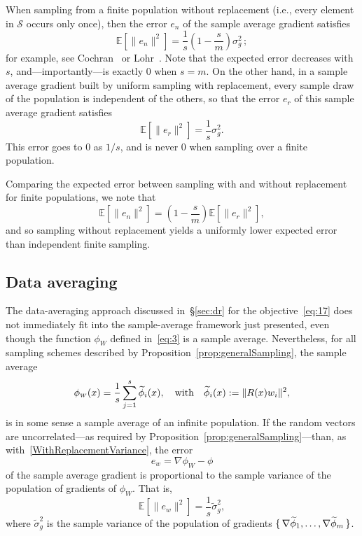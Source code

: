 \documentclass[nospthms]{svjour3}
\numberwithin{equation}{section}
\def\norm#1{\|#1\|}
\def\text #1{\hbox{\quad#1\quad}}
\def\W{_{\scriptscriptstyle W}}
\def\phitilde{\skew3\widetilde\phi}
\def\sigmatilde{\widetilde\sigma}
\def\Sscr{\mathcal{S}}
\def\expval{\mathbb{E}}
\def\sample{\Sscr}
\begin{document}
When sampling from a finite population without replacement (i.e.,
every element in $\sample$ occurs only once), then the error $e_n$ of
the sample average gradient satisfies
\begin{equation} \label{WithoutReplacementVariance}
  \expval[\norm{e_n}^2] = \frac1s\left(1 - \frac{s}{m}\right) \sigma^2_g\,;
\end{equation}
for example, see Cochran~\cite{Cochran1977} or
Lohr~\cite[\S2.7]{lohr1999sampling}.  Note that the expected error
decreases with $s$, and---importantly---is exactly 0 when $s=m$.  On
the other hand, in a sample average gradient built by uniform sampling with
replacement, every sample draw of the population is independent of the
others, so that the error $e_r$ of this sample average gradient satisfies
\begin{equation}
  \label{WithReplacementVariance}
  \expval[\norm{e_r}^2] = \frac{1}{s}\sigma^2_g.
\end{equation}
This error goes to 0 as $1/s$, and is never 0 when sampling over a
finite population.

Comparing the expected error between sampling with and without
replacement for finite populations, we note that
\[
\expval[\norm{e_n}^2] = \left(1-\frac{s}{m}\right)\expval[\norm{e_r}^2],
\]
and so sampling without replacement yields a uniformly lower expected
error than independent finite sampling.







\subsection{Data averaging}

The data-averaging approach discussed in~\S\ref{sec:dr} for the
objective~\eqref{eq:17} does not immediately fit into the
sample-average framework just presented, even though the function
$\phi\W$ defined in~\eqref{eq:3} is a sample average. Nevertheless,
for all sampling schemes described by
Proposition~\ref{prop:generalSampling}, the sample average
\[
\phi\W(x) = \frac1s\sum_{j=1}^s\phitilde_i(x),
\text{with}
\phitilde_i(x) := \|R(x)w_i\|^2,
\]
is in some sense a sample average of an infinite population. If the
random vectors are uncorrelated---as required by
Proposition~\ref{prop:generalSampling}---than, as
with~\eqref{WithReplacementVariance}, the error \[e_w = \nabla\phi\W -
\phi\] of the sample average gradient is proportional to the sample
variance of the population of gradients of $\phi\W$. That is,
\[
\expval[\norm{e_w}^2] = \frac1s\sigmatilde_g^2,
\]
where $\sigmatilde_g^2$ is the sample variance of the population of
gradients $\{\,\nabla\phitilde_1,\ldots,\nabla\phitilde_m\,\}$.
\end{document}
